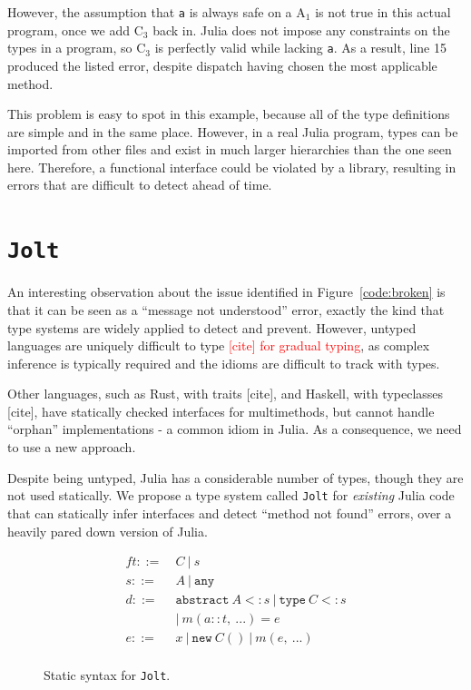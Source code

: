 \documentclass[preprint]{sigplanconf}
\newcommand{\xt}[1]{\texttt{#1}}
\newcommand{\abstype}[2]{\xt{abstract}~#1 <: #2}
\newcommand{\oftype}[2]{#1::#2}
\newcommand{\m}[2]{{#1}(#2)}
\newcommand{\contype}[2]{\xt{type}~#1 <: #2}
\newcommand{\any}{\xt{any}}
\newcommand{\jolt}{\xt{Jolt}}
\renewcommand{\ldots}{...}
\newcommand{\cnum}[2]{$\text{#1}_#2$}
\begin{document}
However, the assumption that \xt{a} is always safe on a \cnum{A}{1} is not true
in this actual program, once we add \cnum{C}{3} back in. Julia does not impose
any constraints on the types in a program, so \cnum{C}{3} is perfectly valid
while lacking \xt{a}. As a result, line 15 produced the listed error, despite 
dispatch having chosen the most applicable method.

This problem is easy to spot in this example, because all of the type definitions
are simple and in the same place. However, in a real Julia program, types can be
imported from other files and exist in much larger hierarchies than the one seen
here. Therefore, a functional interface could be violated by a library, resulting in
errors that are difficult to detect ahead of time.

\section{\jolt}
An interesting observation about the issue identified in Figure~\ref{code:broken}
is that it can be seen as a ``message not understood'' error, exactly the kind
that type systems are widely applied to detect and prevent. However, untyped 
languages are uniquely difficult to type \textcolor{red}{[cite] for gradual typing}, as complex inference is typically
required and the idioms are difficult to track with types.

Other languages, such as Rust, with traits [cite], and Haskell, with 
typeclasses [cite], have statically checked interfaces for multimethods, but 
cannot handle ``orphan'' implementations - a common idiom in Julia. As a 
consequence, we need to use a new approach.

Despite being untyped, Julia has a considerable
number of types, though they are not used statically. We propose a type system called \jolt\space
for \emph{existing} Julia code that can statically infer interfaces and detect
``method not found'' errors, over a heavily pared down version of Julia.

\begin{figure}
\begin{align*}f
t ::=~&  C ~|~ s\\
s ::=~& A ~|~ \any\\
d ::=~& \abstype{A}{s} ~|~ \contype{C}{s} \\
  & |~ \m{m}{\oftype{a}{t}, ~\ldots} = e\\
e ::=~& x ~|~ \xt{new} ~ C() ~|~ m(e,~\ldots) \\
\end{align*}
\caption{Static syntax for \jolt.}
\label{fm:syntax}
\end{figure}
\end{document}
